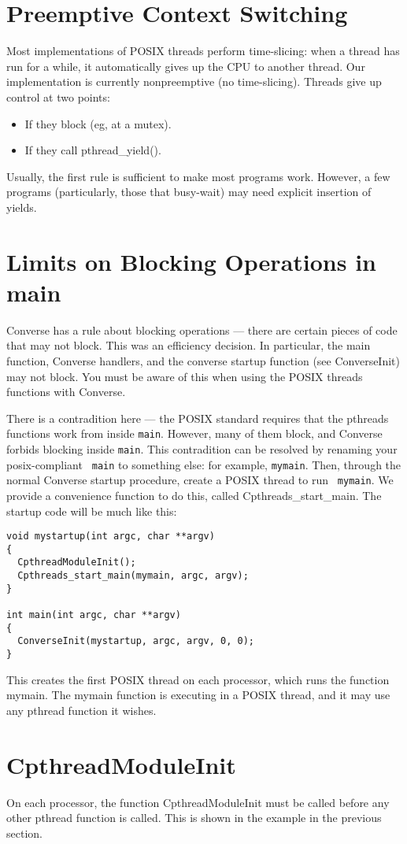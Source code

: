 \section{Preemptive Context Switching}

Most implementations of POSIX threads perform time-slicing: when a thread
has run for a while, it automatically gives up the CPU to another thread.
Our implementation is currently nonpreemptive (no time-slicing).  Threads
give up control at two points:

\begin{itemize}
\item{If they block (eg, at a mutex).}
\item{If they call pthread\_yield().}
\end{itemize}

Usually, the first rule is sufficient to make most programs work.
However, a few programs (particularly, those that busy-wait) may need
explicit insertion of yields.

\section{Limits on Blocking Operations in main}

Converse has a rule about blocking operations --- there are certain
pieces of code that may not block.  This was an efficiency decision.
In particular, the main function, Converse handlers, and the converse
startup function (see ConverseInit) may not block.  You must be aware
of this when using the POSIX threads functions with Converse.

There is a contradition here --- the POSIX standard requires that the
pthreads functions work from inside {\tt main}.  However, many of them
block, and Converse forbids blocking inside {\tt main}.  This
contradition can be resolved by renaming your posix-compliant {\tt
main} to something else: for example, {\tt mymain}.  Then, through the
normal Converse startup procedure, create a POSIX thread to run {\tt
mymain}.  We provide a convenience function to do this, called
Cpthreads\_start\_main.  The startup code will be much like this:

\begin{verbatim}
void mystartup(int argc, char **argv)
{
  CpthreadModuleInit();
  Cpthreads_start_main(mymain, argc, argv);
}

int main(int argc, char **argv)
{
  ConverseInit(mystartup, argc, argv, 0, 0);
}
\end{verbatim}

This creates the first POSIX thread on each processor, which runs the
function mymain.  The mymain function is executing in a POSIX thread,
and it may use any pthread function it wishes.

\section{CpthreadModuleInit}

On each processor, the function CpthreadModuleInit must be called
before any other pthread function is called.  This is shown in the
example in the previous section.
